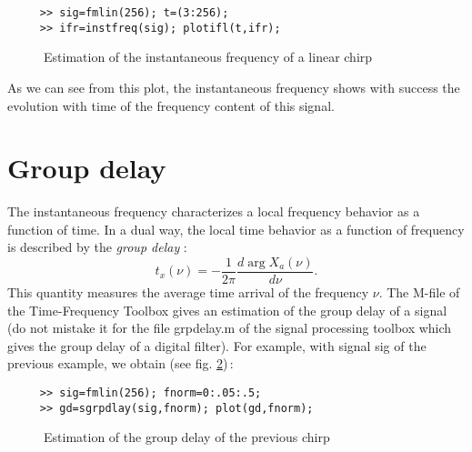 \begin{verbatim}
     >> sig=fmlin(256); t=(3:256);
     >> ifr=instfreq(sig); plotifl(t,ifr);
\end{verbatim}
\begin{figure}[htb]
\epsfxsize=10cm
\epsfysize=6cm
\centerline{}
\caption{\label{Ns3fig1}Estimation of the instantaneous frequency of a
linear chirp}
\end{figure}
As we can see from this plot, the instantaneous frequency shows with
success the evolution with time of the frequency content of this signal.


\section{Group delay}
  The instantaneous frequency characterizes a local frequency behavior as a
function of time. In a dual way, the local time behavior as a function of
frequency is described by the {\it group delay} :
\[t_x(\nu) = -\frac{1}{2\pi}  \frac{d\arg{X_a(\nu)}}{d \nu}.\]
This quantity measures the average time arrival of the frequency $\nu$. The
M-file  of the
Time-Frequency Toolbox gives an estimation of the group delay of a signal
(do not mistake it for the file {\ttfamily grpdelay.m} of the signal
processing toolbox which gives the group delay of a digital filter). For
example, with signal {\ttfamily sig} of the previous example, we obtain
(see fig. \ref{Ns4fig1})\,:
\begin{verbatim}
     >> sig=fmlin(256); fnorm=0:.05:.5;
     >> gd=sgrpdlay(sig,fnorm); plot(gd,fnorm);
\end{verbatim}

\begin{figure}[htb]
\epsfxsize=10cm
\epsfysize=6cm
\centerline{}
\caption{\label{Ns4fig1}Estimation of the group delay of the previous chirp}
\end{figure}

